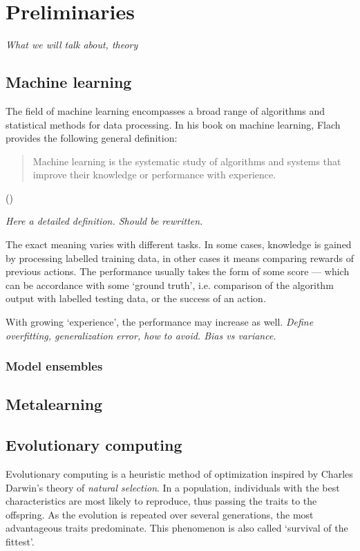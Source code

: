 \chapter{Preliminaries}

\textit{What we will talk about, theory}

\section{Machine learning}
The field of machine learning encompasses a broad range of algorithms and statistical methods for data processing. In his book on machine learning, Flach provides the following general definition:

\blockquote{Machine learning is the systematic study of algorithms and systems that improve their knowledge or performance with experience.} (\cite{Flach:2012:MLA:2490546}) %

\textit{Here a detailed definition. Should be rewritten.}

The exact meaning varies with different tasks. In some cases, knowledge is gained by processing labelled training data, in other cases it means comparing rewards of previous actions. The performance usually takes the form of some score --- which can be accordance with some `ground truth', i.e. comparison of the algorithm output with labelled testing data, or the success of an action. %


With growing `experience', the performance may increase as well.
\textit{Define overfitting, generalization error, how to avoid. Bias vs variance.}

\subsection{Model ensembles}

\section{Metalearning}


\section{Evolutionary computing}
Evolutionary computing is a heuristic method of optimization inspired by Charles Darwin's theory of \textit{natural selection}. \cite{darwin} In a population, individuals with the best characteristics are most likely to reproduce, thus passing the traits to the offspring. As the evolution is repeated over several generations, the most advantageous traits predominate. This phenomenon is also called `survival of the fittest'. %

